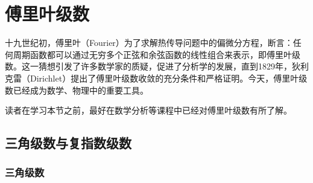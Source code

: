 \section{傅里叶级数}\label{sec:Fourier_Series}

十九世纪初，傅里叶（Fourier）为了求解热传导问题中的偏微分方程，断言：任何周期函数都可以通过无穷多个正弦和余弦函数的线性组合来表示，即傅里叶级数。这一猜想引发了许多数学家的质疑，促进了分析学的发展，直到1829年，狄利克雷（Dirichlet）提出了傅里叶级数收敛的充分条件和严格证明。今天，傅里叶级数已经成为数学、物理中的重要工具。

读者在学习本节之前，最好在数学分析等课程中已经对傅里叶级数有所了解。

\subsection{三角级数与复指数级数}\label{sub:tri_exp_series}

\subsubsection{三角级数}


